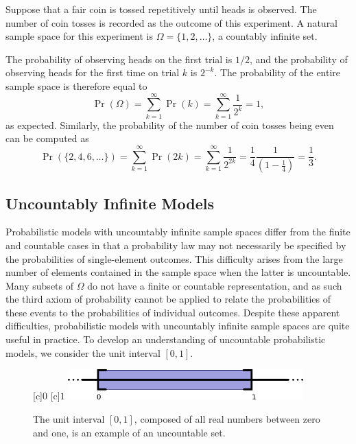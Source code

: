 \begin{example} \label{example:CoinTossSequence}
Suppose that a fair coin is tossed repetitively until heads is observed.
The number of coin tosses is recorded as the outcome of this experiment.
A natural sample space for this experiment is $\Omega = \{ 1, 2, \ldots \}$, a countably infinite set.

The probability of observing heads on the first trial is $1/2$, and the probability of observing heads for the first time on trial $k$ is $2^{-k}$.
The probability of the entire sample space is therefore equal to
\begin{equation*}
\Pr ( \Omega ) = \sum_{k=1}^{\infty} \Pr (k)
= \sum_{k=1}^{\infty} \frac{1}{2^k} = 1 ,
\end{equation*}
as expected.
Similarly, the probability of the number of coin tosses being even can be computed as
\begin{equation*}
\Pr ( \{ 2, 4, 6, \ldots \} )
= \sum_{k=1}^{\infty} \Pr (2k)
= \sum_{k = 1}^{\infty} \frac{1}{2^{2k}}
= \frac{1}{4} \frac{1}{ \left( 1 - \frac{1}{4} \right) }
= \frac{1}{3} .
\end{equation*}
\end{example}


\subsection{Uncountably Infinite Models}

Probabilistic models with uncountably infinite sample spaces differ from the finite and countable cases in that a probability law may not necessarily be specified by the probabilities of single-element outcomes.
This difficulty arises from the large number of elements contained in the sample space when the latter is uncountable.
Many subsets of $\Omega$ do not have a finite or countable representation, and as such the third axiom of probability cannot be applied to relate the probabilities of these events to the probabilities of individual outcomes.
Despite these apparent difficulties, probabilistic models with uncountably infinite sample spaces are quite useful in practice.
To develop an understanding of uncountable probabilistic models, we consider the unit interval $[0, 1]$.

\begin{figure}[htb!]
\begin{center}
\begin{psfrags}
[c]{$0$}
[c]{$1$}
\includegraphics[height=1.17cm]{Figures/2Chapter/uncountablespace}
\end{psfrags}
\caption{The unit interval $[0,1]$, composed of all real numbers between zero and one, is an example of an uncountable set.}
\end{center}
\end{figure}

